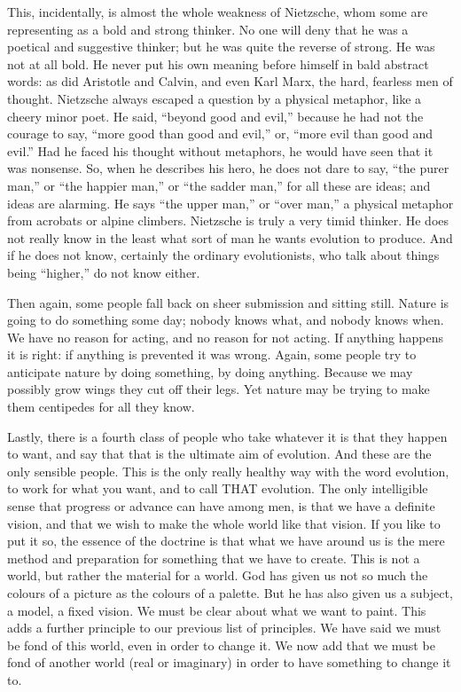 This, incidentally, is almost the whole weakness of Nietzsche, whom some are representing as a bold and strong thinker. No one will deny that he was a poetical and suggestive thinker; but he was quite the reverse of strong. He was not at all bold. He never put his own meaning before himself in bald abstract words: as did Aristotle and Calvin, and even Karl Marx, the hard, fearless men of thought. Nietzsche always escaped a question by a physical metaphor, like a cheery minor poet. He said, “beyond good and evil,” because he had not the courage to say, “more good than good and evil,” or, “more evil than good and evil.” Had he faced his thought without metaphors, he would have seen that it was nonsense. So, when he describes his hero, he does not dare to say, “the purer man,” or “the happier man,” or “the sadder man,” for all these are ideas; and ideas are alarming. He says “the upper man,” or “over man,” a physical metaphor from acrobats or alpine climbers. Nietzsche is truly a very timid thinker. He does not really know in the least what sort of man he wants evolution to produce. And if he does not know, certainly the ordinary evolutionists, who talk about things being “higher,” do not know either.

Then again, some people fall back on sheer submission and sitting still. Nature is going to do something some day; nobody knows what, and nobody knows when. We have no reason for acting, and no reason for not acting. If anything happens it is right: if anything is prevented it was wrong. Again, some people try to anticipate nature by doing something, by doing anything. Because we may possibly grow wings they cut off their legs. Yet nature may be trying to make them centipedes for all they know.

Lastly, there is a fourth class of people who take whatever it is that they happen to want, and say that that is the ultimate aim of evolution. And these are the only sensible people. This is the only really healthy way with the word evolution, to work for what you want, and to call THAT evolution. The only intelligible sense that progress or advance can have among men, is that we have a definite vision, and that we wish to make the whole world like that vision. If you like to put it so, the essence of the doctrine is that what we have around us is the mere method and preparation for something that we have to create. This is not a world, but rather the material for a world. God has given us not so much the colours of a picture as the colours of a palette. But he has also given us a subject, a model, a fixed vision. We must be clear about what we want to paint. This adds a further principle to our previous list of principles. We have said we must be fond of this world, even in order to change it. We now add that we must be fond of another world (real or imaginary) in order to have something to change it to.

